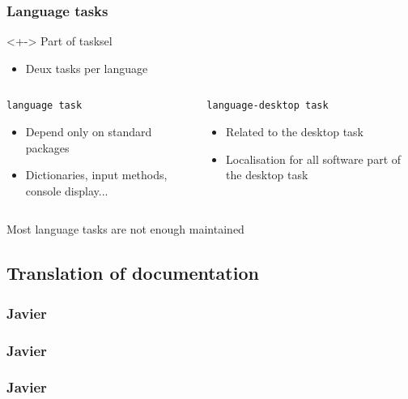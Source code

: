 \documentclass{beamer}
\begin{document}
\begin{frame}
  \frametitle{Language tasks}
	\begin{block}<+->
		{Part of tasksel}
		\begin{itemize}
		\item
			Deux tasks per language
		\end{itemize}
	\end{block}
	\begin{columns}
		\begin{column}{5cm}
			\begin{block}
				{\texttt{language task}}
				\begin{itemize}
				\item
					Depend only on standard packages
				\item
					Dictionaries, input methods, console display...
				\end{itemize}
			\end{block}
		\end{column}
	    	\begin{column}{5cm}
			\begin{block}
				{\texttt{language-desktop task}}
				\begin{itemize}
				\item
					Related to the desktop task
				\item
					Localisation for all software part of the desktop task
				\end{itemize}
			\end{block}
		\end{column}
	\end{columns}
	\begin{block}
		{Most language tasks are not enough maintained}
	\end{block}
\end{frame}

\subsection{Translation of documentation}

\begin{frame}
  \frametitle{Javier}
\end{frame}

\begin{frame}
  \frametitle{Javier}
\end{frame}

\begin{frame}
  \frametitle{Javier}
\end{frame}
\end{document}
